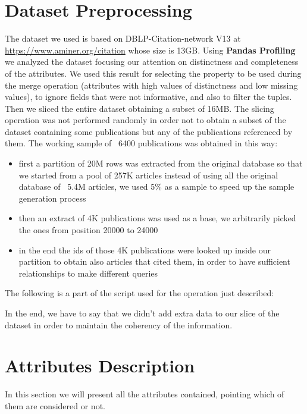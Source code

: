 \documentclass{Configuration_Files/PoliMi3i_thesis}
\begin{document}
\section{Dataset Preprocessing}
The dataset we used is based on DBLP-Citation-network V13 at \url{https://www.aminer.org/citation} whose size is 13GB. Using
\textbf{Pandas Profiling} we analyzed the dataset focusing our attention on distinctness and completeness of the attributes.
We used this result for selecting the property to be used during the merge operation (attributes with high values of distinctness
and low missing values), to ignore fields that were not informative, and also to filter the tuples. Then we sliced the entire
dataset obtaining a subset of 16MB. The slicing operation was not performed randomly in order not to obtain a subset of the
dataset containing some publications but any of the publications referenced by them. The working sample of ~6400 publications
was obtained in this way:
\begin{itemize}
    \item first a partition of 20M rows was extracted from the original database so that we started from a pool of 257K articles
        instead of using all the original database of ~5.4M articles, we used 5\% as a sample to speed up the sample generation
        process
    \item then an extract of 4K publications was used as a base, we arbitrarily picked the ones from position 20000 to 24000
    \item in the end the ids of those 4K publications were looked up inside our partition to obtain also articles that cited
        them, in order to have sufficient relationships to make different queries
\end{itemize}
The following is a part of the script used for the operation just described:

\bigskip
In the end, we have to say that we didn't add extra data to our slice of the dataset in order to maintain the coherency of the
information.

\section{Attributes Description}
In this section we will present all the attributes contained, pointing which of them are considered or not.
\end{document}

